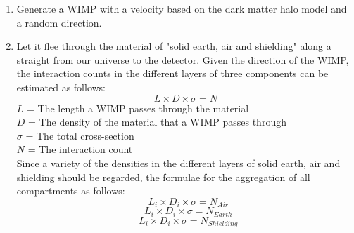 \begin{comment}
\node (dec1) [decision, below of=pro1, yshift=-0.5cm] {Decision 1};
\node (pro2a) [process, below of=dec1, yshift=-0.5cm] {Process 2a};
\node (pro2b) [process, right of=dec1, xshift=2cm] {Process 2b};
\node (out1) [io, below of=pro2a] {Output};
\node (stop) [startstop, below of=out1] {Stop};
\end{comment}
\begin{comment}
\draw [arrow] (in1) -- (pro1);
\draw [arrow] (pro1) -- (dec1);
\draw [arrow] (dec1) -- node[anchor=east] {yes} (pro2a);
\draw [arrow] (dec1) -- node[anchor=south] {no} (pro2b);
\draw [arrow] (pro2b) |- (pro1);
\draw [arrow] (pro2a) -- (out1);
\draw [arrow] (out1) -- (stop);
\end{comment}


\begin{enumerate}
	\item Generate a WIMP with a velocity based on the dark matter halo model and a random direction.\\
	\item Let it flee through the material of "solid earth, air and shielding" along a straight from our universe to the detector. Given the direction of the WIMP, the interaction counts in the different layers of three components can be estimated as follows:\\
	\begin{equation}
    \label{Interaction count}
    L \times D \times \sigma = N
    \end{equation}
    $L$ = The length a WIMP passes through the material\\
    $D$ = The density of the material that a WIMP passes through\\
    $\sigma$ = The total cross-section\\
    $N$ = The interaction count\\ 
	Since a variety of the densities in the different layers of solid earth, air and shielding should be regarded, the formulae for the aggregation of all compartments as follows:\\
	\begin{equation}
    \label{Earth_Interaction}
	\mathop{\sum_{i=1}^{18}} L_i \times D_i \times \sigma = N_{Air}
    \end{equation}
	\begin{equation}
    \label{Air_Interaction}
	\mathop{\sum_{i=1}^{18}} L_i \times D_i \times \sigma = N_{Earth}
    \end{equation}
	\begin{equation}
    \label{Shielding_Interaction}
	\mathop{\sum_{i=1}^{18}} L_i \times D_i \times \sigma = N_{Shielding}
    \end{equation}


\end{enumerate}
